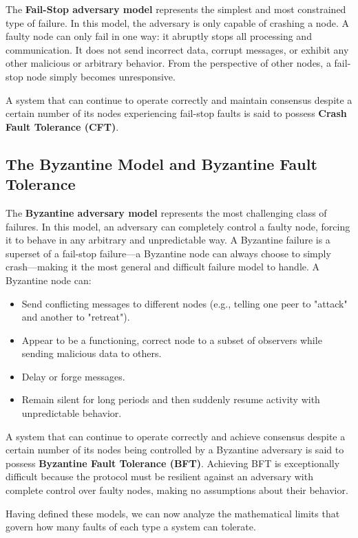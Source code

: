 \documentclass{scrbook}
\begin{document}
The \textbf{Fail-Stop adversary model} represents the simplest and most
constrained type of failure. In this model, the adversary is only
capable of crashing a node. A faulty node can only fail in one way: it
abruptly stops all processing and communication. It does not send
incorrect data, corrupt messages, or exhibit any other malicious or
arbitrary behavior. From the perspective of other nodes, a fail-stop
node simply becomes unresponsive.

A system that can continue to operate correctly and maintain consensus
despite a certain number of its nodes experiencing fail-stop faults is
said to possess \textbf{Crash Fault Tolerance (CFT)}.

\subsection{The Byzantine Model and Byzantine Fault Tolerance}

The \textbf{Byzantine adversary model} represents the most challenging
class of failures. In this model, an adversary can completely control a
faulty node, forcing it to behave in any arbitrary and unpredictable
way. A Byzantine failure is a superset of a fail-stop failure---a
Byzantine node can always choose to simply crash---making it the most
general and difficult failure model to handle. A Byzantine node can:

\begin{itemize}
\item
  Send conflicting messages to different nodes (e.g., telling one peer
  to "attack" and another to "retreat").
\item
  Appear to be a functioning, correct node to a subset of observers
  while sending malicious data to others.
\item
  Delay or forge messages.
\item
  Remain silent for long periods and then suddenly resume activity with
  unpredictable behavior.
\end{itemize}

A system that can continue to operate correctly and achieve consensus
despite a certain number of its nodes being controlled by a Byzantine
adversary is said to possess \textbf{Byzantine Fault Tolerance (BFT)}.
Achieving BFT is exceptionally difficult because the protocol must be
resilient against an adversary with complete control over faulty nodes,
making no assumptions about their behavior.

Having defined these models, we can now analyze the mathematical limits
that govern how many faults of each type a system can tolerate.
\end{document}
